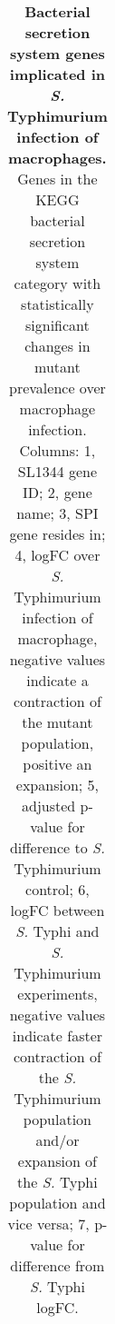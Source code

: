 %
\begin{table}
   \centering
   \noindent
    \caption[Bacterial secretion system genes implicated in {\it S.} Typhimurium infection of macrophages]{\textbf{Bacterial secretion system genes implicated in {\it S.} Typhimurium infection of macrophages.} Genes in the KEGG bacterial secretion system category with statistically significant changes in mutant prevalence over macrophage infection. Columns: 1, SL1344 gene ID; 2, gene name; 3, SPI gene resides in; 4, logFC over {\it S.} Typhimurium infection of macrophage, negative values indicate a contraction of the mutant population, positive an expansion; 5, adjusted p-value for difference to {\it S.} Typhimurium control; 6, logFC between {\it S.} Typhi and {\it S.} Typhimurium experiments, negative values indicate faster contraction of the {\it S.} Typhimurium population and/or expansion of the {\it S.} Typhi population and vice versa; 7, p-value for difference from {\it S.} Typhi logFC. }
    \begin{tabular}{ l
    				l
				l
    				r
				c
				r
				c
				}
   

\end{tabular}
\end{table}
